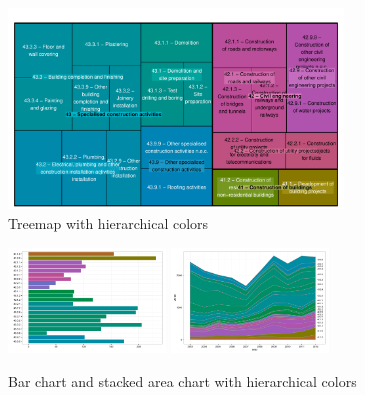 \documentclass[review]{vgtc}                 %
\begin{document}
\begin{figure}[htb]
  \centering
  \includegraphics[width=3.5in]{treemap_F.pdf}
  \caption{Treemap with hierarchical colors}\label{fig:treemapF}
\end{figure}



\begin{figure}[htb]
  \centering
  \includegraphics[width=1.65in]{bar_chart.pdf}
  \includegraphics[width=1.65in]{stackedline_chart.pdf}
  \caption{Bar chart and stacked area chart with hierarchical colors}\label{fig:charts}
\end{figure}

\end{document}
